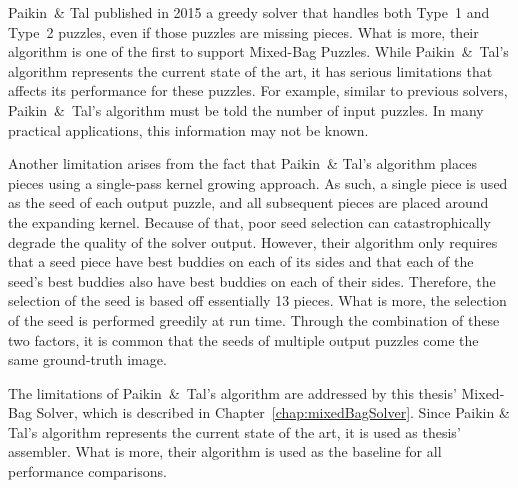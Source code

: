 Paikin~\& Tal \cite{paikin2015} published in 2015 a greedy solver that handles both Type~1 and Type~2 puzzles, even if those puzzles are missing pieces.  What is more, their algorithm is one of the first to support Mixed-Bag Puzzles.  While Paikin~\&~Tal's algorithm represents the current state of the art, it has serious limitations that affects its performance for these puzzles.  For example, similar to previous solvers, Paikin~\&~Tal's algorithm must be told the number of input puzzles.  In many practical applications, this information may not be known.

Another limitation arises from the fact that Paikin~\& Tal's algorithm places pieces using a single-pass kernel growing approach.  As such, a single piece is used as the seed of each output puzzle, and all subsequent pieces are placed around the expanding kernel.  Because of that, poor seed selection can catastrophically degrade the quality of the solver output.  However, their algorithm only requires that a seed piece have best buddies on each of its sides and that each of the seed's best buddies also have best buddies on each of their sides.  Therefore, the selection of the seed is based off essentially 13 pieces.  What is more, the selection of the seed is performed greedily at run time.  Through the combination of these two factors, it is common that the seeds of multiple output puzzles come the same ground-truth image.

The limitations of Paikin~\&~Tal's algorithm are addressed by this thesis' Mixed-Bag Solver, which is described in Chapter~\ref{chap:mixedBagSolver}.  Since Paikin \&  Tal's algorithm represents the current state of the art, it is used as thesis' assembler.  What is more, their algorithm is used as the baseline for all performance comparisons. 